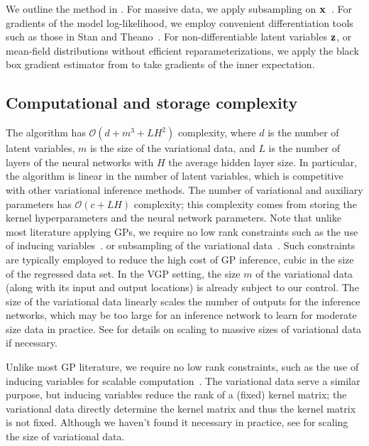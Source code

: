 We outline the method in . For massive data, we
apply subsampling on
$\boldsymbol{\mathbf{x}}$~\citep{hoffman2013stochastic}. For gradients of the model
log-likelihood, we employ convenient differentiation tools such as
those in Stan and Theano~\citep{carpenter2015stan,bergstra2010theano}.
For non-differentiable latent variables $\boldsymbol{\mathbf{z}}$, or mean-field
distributions without efficient reparameterizations,
we apply the black box gradient estimator from \citet{ranganath2014black} to take gradients of the inner expectation.

\subsection{Computational and storage complexity}

The algorithm
has $\mathcal{O}(d+m^3+LH^2)$ complexity, where $d$ is the number of
latent variables, $m$ is the size of the variational data, and $L$
is the number of layers of the neural networks with $H$ the average
hidden layer size.
In particular, the algorithm is linear in the number of latent
variables, which is competitive with other variational inference methods.
The number of variational and auxiliary parameters has
$\mathcal{O}(c+LH)$ complexity; this complexity comes from storing the kernel
hyperparameters and the neural network parameters.
Note that unlike most literature applying \glspl{GP}, we require no
low rank constraints such as the use of inducing
variables~\citep{quinonero2005unifying}.
or
subsampling of the variational data~\citep{hensman2013gaussian}.
Such constraints are typically employed to reduce the high cost of
\gls{GP} inference, cubic in the size of the regressed data set.  In
the \gls{VGP} setting, the size $m$ of the variational data (along
with its input and output locations) is already subject to our
control.
\PP
The size of the variational data linearly scales the number of outputs
for the inference networks, which may be too large for an inference
network to learn for moderate size data in practice.
See  for details on scaling to massive sizes of
variational data if necessary.
\fi

Unlike most \gls{GP} literature, we require no low rank constraints,
such as the use of inducing variables
for scalable computation~\citep{quinonero2005unifying}. The variational data serve a similar
purpose,
but inducing variables reduce the rank of a (fixed) kernel matrix; the
variational data directly determine the kernel matrix and thus the
kernel matrix is not fixed.
Although we haven't found it necessary in practice, see
 for scaling the size of variational data.

